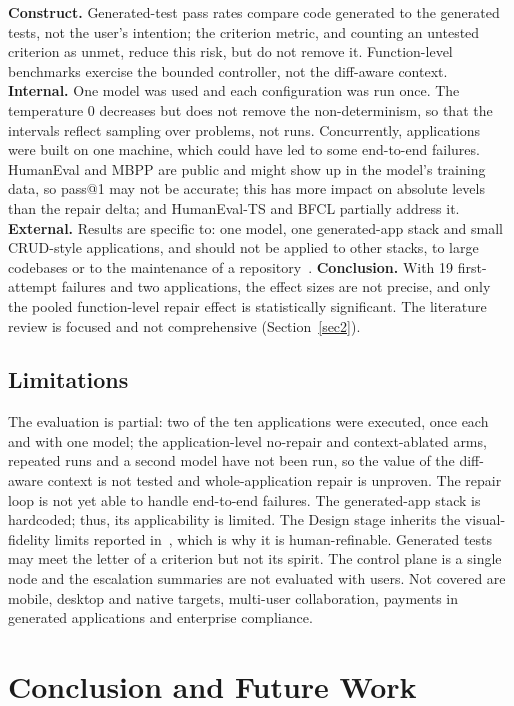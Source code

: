 \documentclass[pdflatex,sn-mathphys-num]{sn-jnl}%
\theoremstyle{thmstyleone}%
\theoremstyle{thmstyletwo}%
\theoremstyle{thmstylethree}%
\begin{document}
\textbf{Construct.} Generated-test pass rates compare code generated to the generated tests, not the user's intention; the criterion metric, and counting an untested criterion as unmet, reduce this risk, but do not remove it. Function-level benchmarks exercise the bounded controller, not the diff-aware context. \textbf{Internal.} One model was used and each configuration was run once. The temperature 0 decreases but does not remove the non-determinism, so that the intervals reflect sampling over problems, not runs. Concurrently, applications were built on one machine, which could have led to some end-to-end failures. HumanEval and MBPP are public and might show up in the model's training data, so pass@1 may not be accurate; this has more impact on absolute levels than the repair delta; and HumanEval-TS and BFCL partially address it. \textbf{External.} Results are specific to: one model, one generated-app stack and small CRUD-style applications, and should not be applied to other stacks, to large codebases or to the maintenance of a repository~\cite{r12jiang,r14bouzenia}. \textbf{Conclusion.} With 19 first-attempt failures and two applications, the effect sizes are not precise, and only the pooled function-level repair effect is statistically significant. The literature review is focused and not comprehensive (Section~\ref{sec2}).

\subsection{Limitations}\label{sec9.4}

The evaluation is partial: two of the ten applications were executed, once each and with one model; the application-level no-repair and context-ablated arms, repeated runs and a second model have not been run, so the value of the diff-aware context is not tested and whole-application repair is unproven. The repair loop is not yet able to handle end-to-end failures. The generated-app stack is hardcoded; thus, its applicability is limited. The Design stage inherits the visual-fidelity limits reported in~\cite{r23si}, which is why it is human-refinable. Generated tests may meet the letter of a criterion but not its spirit. The control plane is a single node and the escalation summaries are not evaluated with users. Not covered are mobile, desktop and native targets, multi-user collaboration, payments in generated applications and enterprise compliance.

\section{Conclusion and Future Work}\label{sec10}
\end{document}
